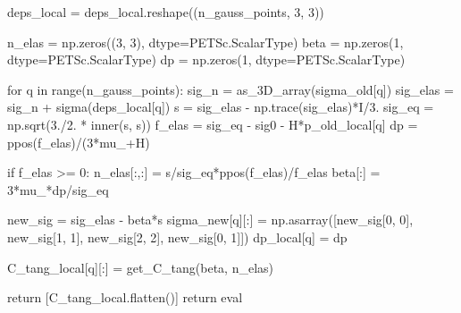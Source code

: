 \documentclass[12pt]{article}
\begin{document}
\begin{appendices}
\begin{pythoncode}
            deps_local = deps_local.reshape((n_gauss_points, 3, 3))

            n_elas = np.zeros((3, 3), dtype=PETSc.ScalarType) 
            beta = np.zeros(1, dtype=PETSc.ScalarType) 
            dp = np.zeros(1, dtype=PETSc.ScalarType) 

            for q in range(n_gauss_points):
                sig_n = as_3D_array(sigma_old[q])
                sig_elas = sig_n + sigma(deps_local[q])
                s = sig_elas - np.trace(sig_elas)*I/3.
                sig_eq = np.sqrt(3./2. * inner(s, s))
                f_elas = sig_eq - sig0 - H*p_old_local[q]
                dp = ppos(f_elas)/(3*mu_+H)

                if f_elas >= 0:
                    n_elas[:,:] = s/sig_eq*ppos(f_elas)/f_elas 
                    beta[:] = 3*mu_*dp/sig_eq                 
                
                new_sig = sig_elas - beta*s
                sigma_new[q][:] = np.asarray([new_sig[0, 0], new_sig[1, 1], new_sig[2, 2], new_sig[0, 1]])
                dp_local[q] = dp
                
                C_tang_local[q][:] = get_C_tang(beta, n_elas)
            
            return [C_tang_local.flatten()] 
        return eval
    \end{pythoncode}
\end{appendices}
\end{document}
